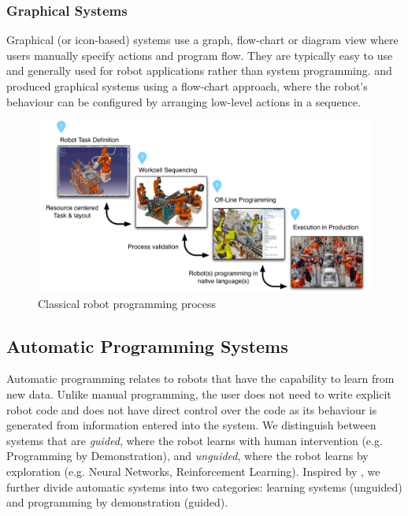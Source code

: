 \subsubsection{Graphical Systems}\label{sssec:Graphical systems}
Graphical (or icon-based) systems use a graph, flow-chart or diagram view where users manually specify actions and program flow. They are typically easy to use and generally used for robot applications rather than system programming. \cite{lego2003} and \cite{bischoff2002morpha} produced graphical systems using a flow-chart approach, where the robot's behaviour can be configured by arranging low-level actions in a sequence.

\begin{figure}[ht]
	\centering
	\includegraphics[width=\linewidth]{figures/manual-programming}
	\caption{Classical robot programming process}
	\label{fig:Classical robot programming process}
\end{figure}


\subsection{Automatic Programming Systems}\label{subsec:Automatic Programming Systems}
Automatic programming relates to robots that have the capability to learn from new data.
Unlike manual programming, the user does not need to write explicit robot code and does not have direct control over the code as its behaviour is generated from information entered into the system.
We distinguish between systems that are \textit{guided}, where the robot learns with human intervention (e.g. Programming by Demonstration), and \textit{unguided}, where the robot learns by exploration (e.g. Neural Networks, Reinforcement Learning).
Inspired by \cite{Biggs2003}, we further divide automatic systems into two categories: learning systems (unguided) and programming by demonstration (guided).

